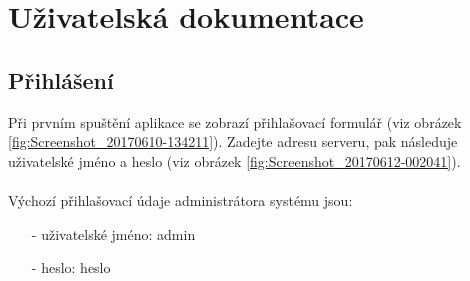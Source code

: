 \documentclass[12pt]{report}
\begin{document}
\endgroup

\chapter{Uživatelská dokumentace}

	
\section{Přihlášení}	
Při prvním spuštění aplikace se zobrazí přihlašovací formulář (viz obrázek \ref{fig:Screenshot_20170610-134211}).
Zadejte adresu serveru, pak následuje uživatelské jméno a heslo (viz obrázek \ref{fig:Screenshot_20170612-002041}). 
\\\\
Výchozí přihlašovací údaje administrátora systému jsou:
\begin{itemize}[noitemsep]
\item [-] uživatelské jméno: admin
\item [-] heslo: heslo
\end{itemize}
\end{document}
